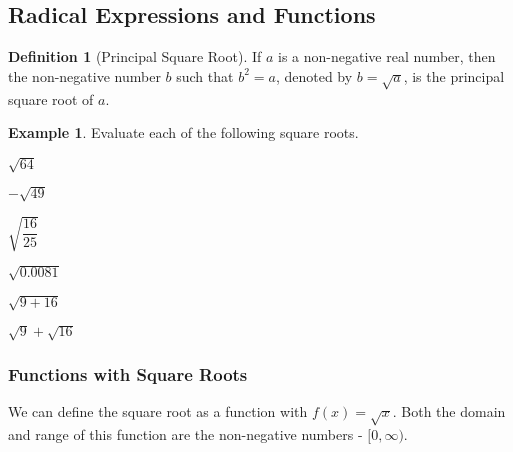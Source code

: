 \documentclass[addpoints,12pt]{exam}
\theoremstyle{definition}
\newtheorem{example}{Example}[subsection]
\newtheorem{definition}{Definition}[subsection]
\begin{document}
\setcounter{section}{10}
\setcounter{subsection}{0}

\subsection{Radical Expressions and Functions}

\begin{definition}[Principal Square Root]
If $a$ is a non-negative real number, then the non-negative number $b$ such that $b^2 = a$, denoted by $b=\sqrt{a}$, is the principal square root of $a$.
\end{definition}
\vspace{.25in}
\begin{example}
Evaluate each of the following square roots.
\begin{enumerate}
\begin{minipage}{.3\textwidth}
\item $\sqrt{64}$
\vspace{.5in}
\item $-\sqrt{49}$
\vspace{.5in}
\end{minipage}%
\begin{minipage}{.3\textwidth}
\item $\sqrt{\dfrac{16}{25}}$
\vspace{.5in}
\item $\sqrt{0.0081}$
\vspace{.5in}
\end{minipage}%
\begin{minipage}{.3\textwidth}
\item $\sqrt{9+16}$
\vspace{.5in}
\item $\sqrt{9}+\sqrt{16}$
\vspace{.5in}
\end{minipage}%
\end{enumerate}
\end{example}
\vspace{.25in}

\subsubsection*{Functions with Square Roots}

We can define the square root as a function with $f(x) = \sqrt{x}$. Both the domain and range of this function are the non-negative numbers - $[0,\infty)$.

\vspace{.25in}
\end{document}
